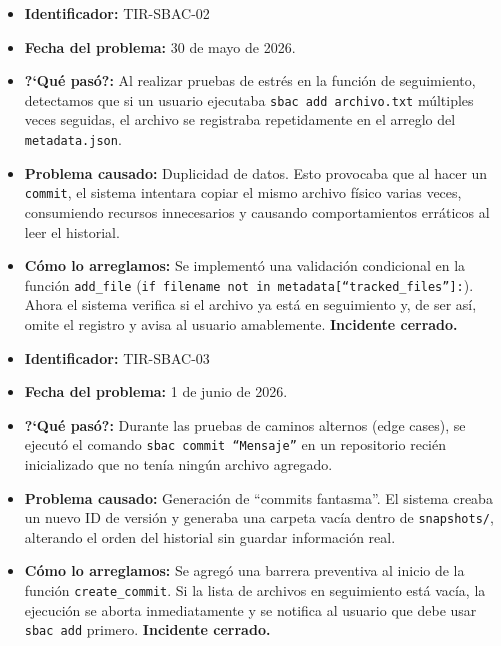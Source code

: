 \documentclass[12pt, letterpaper]{article}
\begin{document}
\vspace{0.3cm}

\begin{itemize}[leftmargin=*]
    \item \textbf{Identificador:} TIR-SBAC-02
    \item \textbf{Fecha del problema:} 30 de mayo de 2026.
    \item \textbf{?`Qué pasó?:} Al realizar pruebas de estrés en la función de seguimiento, detectamos que si un usuario ejecutaba \texttt{sbac add archivo.txt} múltiples veces seguidas, el archivo se registraba repetidamente en el arreglo del \texttt{metadata.json}.
    \item \textbf{Problema causado:} Duplicidad de datos. Esto provocaba que al hacer un \texttt{commit}, el sistema intentara copiar el mismo archivo físico varias veces, consumiendo recursos innecesarios y causando comportamientos erráticos al leer el historial.
    \item \textbf{Cómo lo arreglamos:} Se implementó una validación condicional en la función \texttt{add\_file} (\texttt{if filename not in metadata[``tracked\_files'']:}). Ahora el sistema verifica si el archivo ya está en seguimiento y, de ser así, omite el registro y avisa al usuario amablemente. \textbf{Incidente cerrado.}
\end{itemize}

\vspace{0.3cm}

\begin{itemize}[leftmargin=*]
    \item \textbf{Identificador:} TIR-SBAC-03
    \item \textbf{Fecha del problema:} 1 de junio de 2026.
    \item \textbf{?`Qué pasó?:} Durante las pruebas de caminos alternos (edge cases), se ejecutó el comando \texttt{sbac commit ``Mensaje''} en un repositorio recién inicializado que no tenía ningún archivo agregado. 
    \item \textbf{Problema causado:} Generación de ``commits fantasma''. El sistema creaba un nuevo ID de versión y generaba una carpeta vacía dentro de \texttt{snapshots/}, alterando el orden del historial sin guardar información real.
    \item \textbf{Cómo lo arreglamos:} Se agregó una barrera preventiva al inicio de la función \texttt{create\_commit}. Si la lista de archivos en seguimiento está vacía, la ejecución se aborta inmediatamente y se notifica al usuario que debe usar \texttt{sbac add} primero. \textbf{Incidente cerrado.}
\end{itemize}
\end{document}
